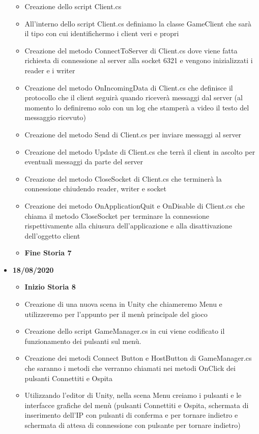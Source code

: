 \documentclass[12pt]{article}
\begin{document}
\begin{itemize}
\begin{itemize}
	\item Creazione dello script Client.cs
	\item All'interno dello script Client.cs definiamo la classe GameClient che sarà il tipo con cui identifichermo i client veri e propri
	\item Creazione del metodo ConnectToServer di Client.cs dove viene fatta richiesta di connessione al server alla socket 6321 e vengono inizializzati i reader e i writer
	\item Creazione del metodo OnIncomingData di Client.cs che definisce il protocollo che il client seguirà quando riceverà messaggi dal server (al momento lo definiremo solo con un log che stamperà a video il testo del messaggio ricevuto)
	\item Creazione del metodo Send di Client.cs per inviare messaggi al server
	\item Creazione del metodo Update di Client.cs che terrà il client in ascolto per eventuali messaggi da parte del server
	\item Creazione del metodo CloseSocket di Client.cs che terminerà la connessione chiudendo reader, writer e socket
	\item Creazione dei metodo OnApplicationQuit e OnDisable di Client.cs che chiama il metodo CloseSocket per terminare la connessione rispettivamente alla chiusura dell'applicazione e alla disattivazione dell'oggetto client
	\item \textbf{Fine Storia 7}
	\end{itemize}
\item \textbf{18/08/2020}
	\begin{itemize}
	\item \textbf{Inizio Storia 8}
	\item Creazione di una nuova scena in Unity che chiameremo Menu e utilizzeremo per l'appunto per il menù principale del gioco
	\item Creazione dello script GameManager.cs in cui viene codificato il funzionamento dei pulsanti sul menù.
	\item Creazione dei metodi Connect Button e HostButton di GameManager.cs che saranno i metodi che verranno chiamati nei metodi OnClick dei pulsanti Connettiti e Ospita
	\item Utilizzando l'editor di Unity, nella scena Menu creiamo i pulsanti e le interfacce grafiche del menù (pulsanti Connettiti e Ospita, schermata di inserimento dell'IP con pulsanti di conferma e per tornare indietro e schermata di attesa di connessione con pulsante per tornare indietro)

\end{itemize}
\end{itemize}
\end{document}
